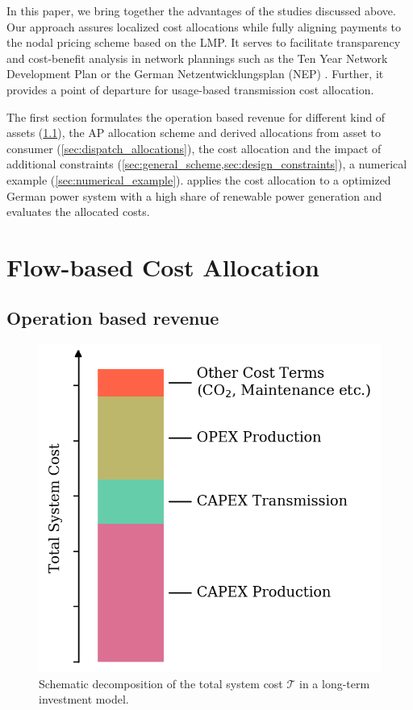 \documentclass[11pt,twocolumn]{article}
\newcommand{\totalcost}{\mathcal{T}}
\begin{document}
In this paper, we bring together the advantages of the studies discussed above. Our approach assures localized cost allocations while fully aligning payments to the nodal pricing scheme based on the LMP. It serves to facilitate transparency and cost-benefit analysis in network plannings such as the Ten Year Network Development Plan \cite{entso-e_completing_2020} or the German Netzentwicklungsplan (NEP) \cite{bundesnetzagentur_netzentwicklungsplan_2020}. Further, it provides a point of departure for usage-based transmission cost allocation.

The first section formulates the operation based revenue for different kind of assets (\cref{sec:zero_profit_rule}),  the AP allocation scheme and derived allocations from asset to consumer (\cref{sec:dispatch_allocations}), the cost allocation and the impact of additional constraints (\cref{sec:general_scheme,sec:design_constraints}), a numerical example (\cref{sec:numerical_example}).  applies the cost allocation to a optimized German power system with a high share of renewable power generation and evaluates the allocated costs.  


\section{Flow-based Cost Allocation}

\subsection{Operation based revenue}
\label{sec:zero_profit_rule}

\begin{figure}[h]
    \centering
    \includegraphics[width=.8\linewidth]{cost_decomposition.png}
    \caption{Schematic decomposition of the total system cost $\totalcost$ in a long-term investment model.}
    \label{fig:cost_decomposition}
\end{figure}
    
\end{document}
